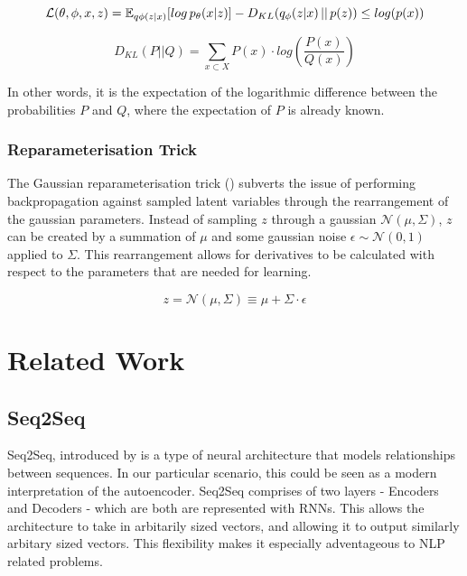 \documentclass[12pt,twoside]{report}
\begin{document}
\begin{equation}
	\label{eqn:elbo}
	\mathcal{L}(\theta, \phi, x, z) = \mathbb{E}_{q \phi (z|x)}[log \thinspace p_{\theta}(x|z)] - D_{KL}(q_{\phi}(z|x)\thinspace||\thinspace p(z)) \leq log (p(x))
\end{equation}

\begin{equation}
	\label{eqn:kl_divergence}
D_{KL}(P ||Q) = \sum_{x \subset X} P(x) \cdot log (\frac{P(x)}{Q(x)})
\end{equation}

In other words, it is the expectation of the logarithmic difference between the probabilities $P$ and $Q$, where the expectation of $P$ is already known.

\subsubsection*{Reparameterisation Trick}

The Gaussian reparameterisation trick (\cite{kingma_auto-encoding_2013}) subverts the issue of performing backpropagation against sampled latent variables through the rearrangement of the gaussian parameters. Instead of sampling $z$ through a gaussian $\mathcal{N}(\mu, \Sigma)$, $z$ can be created by a summation of $\mu$ and some gaussian noise $\epsilon \sim \mathcal{N}(0,1)$ applied to $\Sigma$. This rearrangement allows for derivatives to be calculated with respect to the parameters that are needed for learning.

$$z = \mathcal{N}(\mu, \Sigma) \equiv \mu + \Sigma \cdot \epsilon $$ 


\section{Related Work}


\subsection{Seq2Seq}

Seq2Seq, introduced by \cite{sutskever_sequence_2014} is a type of neural architecture that models relationships between sequences. In our particular scenario, this could be seen as a modern interpretation of the autoencoder. Seq2Seq comprises of two layers - Encoders and Decoders - which are both are represented with RNNs. This allows the architecture to take in arbitarily sized vectors, and allowing it to output similarly arbitary sized vectors. This flexibility makes it especially adventageous to NLP related problems.
\end{document}
